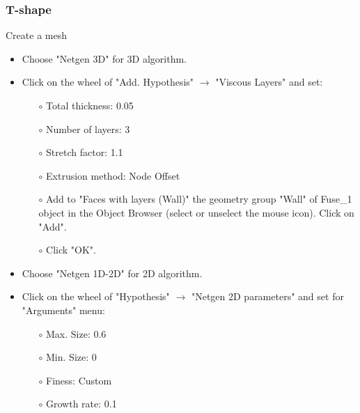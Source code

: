 \documentclass[10pt, hyperref={unicode=true,pdfusetitle, bookmarks=true,bookmarksnumbered=false,bookmarksopen=false, breaklinks=false,pdfborder={0 0 1},backref=true,colorlinks=true,linkcolor=darkblue,pageanchor}]{beamer}
\begin{document}
\begin{frame}
\frametitle{T-shape}
\begin{block}{Create a mesh}

\begin{itemize}
\item Choose "Netgen 3D" for 3D algorithm.
\item Click on the wheel of "Add. Hypothesis" $\rightarrow$ "Viscous Layers" and set:
    \begin{itemize}
    \item [$\circ$] Total thickness: 0.05
    \item [$\circ$] Number of layers: 3
    \item [$\circ$] Stretch factor: 1.1
    \item [$\circ$] Extrusion method: Node Offset
    \item [$\circ$] Add to "Faces with layers (Wall)" the geometry group "Wall" of Fuse\_1 object in the Object Browser (select or unselect the mouse icon). Click on "Add".
    \item [$\circ$] Click "OK".
    \end{itemize}
\item Choose "Netgen 1D-2D" for 2D algorithm.
\item Click on the wheel of "Hypothesis" $\rightarrow$ "Netgen 2D parameters" and set for "Arguments" menu:
    \begin{itemize}
    \item [$\circ$] Max. Size: 0.6
    \item [$\circ$] Min. Size: 0
    \item [$\circ$] Finess: Custom
    \item [$\circ$] Growth rate: 0.1
    \end{itemize}

\end{itemize}

\end{block}
\end{frame}
\end{document}
